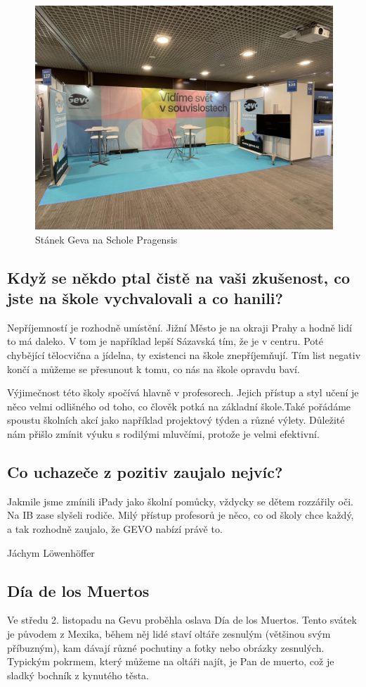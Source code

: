\documentclass[12pt, a4paper]{article}
\begin{document}
\begin{multicols*}{2}
		\begin{figure}[H]
			\centering
		  	\includegraphics[width=.4\textwidth]{PR}
			\caption{Stánek Geva na Schole Pragensis}
	 	\end{figure}

		\subsection*{Když se někdo ptal čistě na vaši zkušenost, co jste na škole vychvalovali a co hanili?}
		Nepříjemností je rozhodně umístění. Jižní Město je na okraji Prahy a hodně lidí to má daleko. V tom je například lepší Sázavská tím, že je v centru. Poté chybějící tělocvična a jídelna, ty existenci na škole znepříjemňují. Tím list negativ končí a můžeme se přesunout k tomu, co nás na škole opravdu baví.

		Výjimečnost této školy spočívá hlavně v profesorech. Jejich přístup a styl učení je něco velmi odlišného od toho, co člověk potká na základní škole.Také pořádáme spoustu školních akcí jako například projektový týden a různé výlety. Důležité nám přišlo zmínit výuku s rodilými mluvčími, protože je velmi efektivní.

		\subsection*{Co uchazeče z pozitiv zaujalo nejvíc?}
		Jakmile jsme zmínili iPady jako školní pomůcky, vždycky se dětem rozzářily oči. Na IB zase slyšeli rodiče. Milý přístup profesorů je něco, co od školy chce každý, a tak rozhodně zaujalo, že GEVO nabízí právě to.
		\vspace*{-1\baselineskip}
		\begin{flushright}
			\footnotesize Jáchym Löwenhöffer
		\end{flushright}
		
		\begin{center}\section*{Día de los Muertos}\end{center}
		Ve středu 2. listopadu na Gevu proběhla oslava Día de los Muertos. Tento svátek je původem z Mexika, během něj lidé staví oltáře zesnulým (většinou svým příbuzným), kam dávají různé pochutiny a fotky nebo obrázky zesnulých. Typickým pokrmem, který můžeme na oltáři najít, je Pan de muerto, což je sladký bochník z kynutého těsta.


\end{multicols*}
\end{document}
